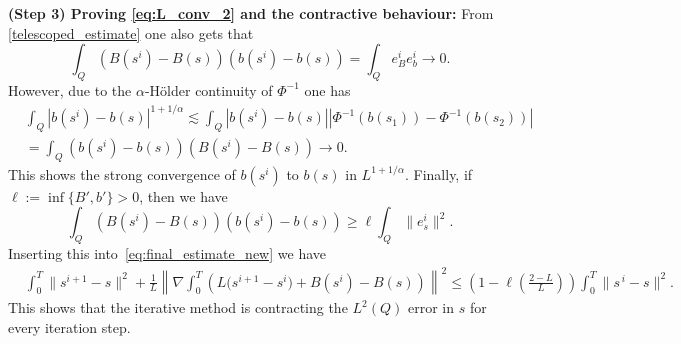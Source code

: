 \documentclass[review,11pt]{article}
\numberwithin{equation}{section}
\begin{document}
\textbf{(Step 3) Proving \eqref{eq:L_conv_2} and the contractive behaviour:} 
From  \eqref{telescoped_estimate} one also gets that
\[
\int_Q (B(s^i)-B(s))(b(s^i)-b(s)) 
= \int_Q e^i_B e^i_b \longrightarrow 0.
\]
However, due to the $\alpha$-H\"older continuity of $\Phi^{-1}$ one has
\begin{align*}
    &\int_Q |b(s^i)-b(s)|^{1+1/\alpha}
    \lesssim \int_Q |b(s^i)-b(s)|
    |\Phi^{-1}(b(s_1)) - \Phi^{-1}(b(s_2))|\\
    &= \int_Q (b(s^i)-b(s))(B(s^i)-B(s)) 
    \longrightarrow 0.
\end{align*}
This shows the strong convergence of $b(s^i)$ to $b(s)$ in $L^{1+1/\alpha}$. Finally, if $\ell:= \inf\{B',b'\}>0$, then we have 
\[
\int_Q (B(s^i)-B(s))(b(s^i)-b(s))
\geq \ell \int_Q \|e^i_s\|^2.
\]
Inserting this into~\eqref{eq:final_estimate_new} we have
\begin{align}
    &\int_0^T \|s^{i+1} -s\|^{2}
    +\frac{1}{L}\left\| \nabla \int_0^T\left (L\big(s^{i+1} - s^i\big) + B(s^i)-B(s)\right)\right\|^{2}\leq 
    \left (1-\ell \left(\frac{2-L}{L}\right)\right)\int_0^T \|s^{\,i}-s\|^{2}.
\end{align}
This shows that the iterative method is contracting the $L^2(Q)$ error in $s$ for every iteration step.

\end{document}
